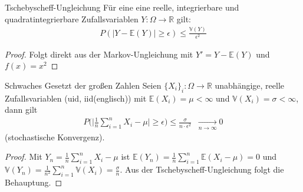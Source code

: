 \begin{Satz}{Tschebyscheff-Ungleichung }
Für eine  eine  reelle, integrierbare und quadratintegrierbare  Zufallsvariablen $Y : \Omega \to \mathbb{R}$  gilt:
\begin{align*}
P (|Y  - \mathbb{E} (Y)|  \geq \epsilon) \leq \frac{\mathbb{V} (Y)}{ \epsilon^2} 
\end{align*}
\end{Satz}
\begin{proof}
Folgt direkt aus der Markov-Ungleichung mit $Y' = Y -\mathbb{E}(Y)$ und $f(x) = x^2$
\end{proof}



\begin{Satz}{Schwaches Gesetzt der großen Zahlen }
Seien $\{X_i  \}_i: \Omega \to \mathbb{R}$ unabhängige, reelle Zufallsvariablen (uid, iid(englisch)) mit $\mathbb{E}(X_i) = \mu < \infty$ und $\mathbb{V}(X_i) = \sigma < \infty$, dann gilt
\begin{align*}
P \bigl  ( \bigl | \frac{1}{n} \sum_{i=1}^{n} X_i - \mu \bigr |  \geq \epsilon \bigr) \leq \frac{\sigma}{ n \cdot \epsilon^2} \; \; \underset{n \to \infty}{\longrightarrow} 0
\end{align*}
(stochastische Konvergenz). 
\end{Satz}
\begin{proof}
Mit $Y_n =  \frac{1}{n} \sum_{i=1}^{n}  X_i - \mu$ ist $\mathbb{E}(Y_n) =  \frac{1}{n} \sum_{i=1}^{n} \mathbb{E}( X_i - \mu) = 0$ und 
$\mathbb{V}(Y_n) =  \frac{1}{n^2} \sum_{i=1}^{n} \mathbb{V}( X_i ) = \frac{\sigma}{n}$. Aus der Tschebyscheff-Ungleichung folgt die Behauptung.
\end{proof}



